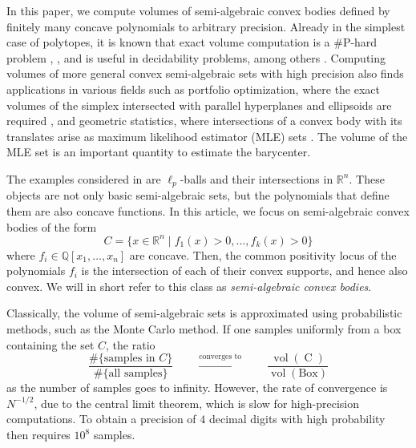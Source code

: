 \documentclass[sigconf, nonacm]{acmart} %
\DeclareMathOperator{\vol}{vol}
\begin{document}
In this paper, we compute volumes of semi-algebraic convex bodies defined by finitely many concave polynomials to arbitrary precision. 
Already in the simplest case of polytopes, it is known that exact volume computation is a \#P-hard problem \cite{volumes-is-difficult}, 
\cite{Khachiyan1993}, \cite{dyer-frieze} 
and is useful in decidability problems, among others \cite{GE2018110}. 
Computing volumes of more general convex semi-algebraic sets with high precision also finds applications in various fields such as portfolio optimization, where the exact volumes of the simplex intersected with parallel hyperplanes and ellipsoids are required \cite{portfolio}, and  geometric statistics, where intersections of a convex body with its translates arise as maximum likelihood estimator (MLE) sets \cite{rameshwahl}. The volume of the MLE set is an important quantity to estimate the barycenter. 

The examples considered in \cite{rameshwahl} are $\ell_p$-balls and their intersections in $\mathbb R^n$. These objects are not only basic semi-algebraic sets, but the polynomials that define them are also concave functions. In this article, we focus on semi-algebraic convex bodies of the form
\begin{equation}\label{eq:class}
    C = \{ x \in \mathbb R^n \mid f_1(x) > 0 , \dots, f_k(x) > 0 \}
\end{equation}
where $f_i \in \mathbb Q[x_1, \dots, x_n]$ are concave. Then, the common positivity locus of the polynomials $f_i$ is the intersection of each of their convex supports, and hence also convex. We will in short refer to this class as \textit{semi-algebraic convex bodies}.


Classically, the volume of semi-algebraic sets is approximated using probabilistic methods, such as the Monte Carlo method. If one samples  uniformly from a box containing the set $C$, the ratio 
\begin{equation*}
    \frac{\# \{\text{samples in $C$}\}}{\# \{\text{all samples}\}} \qquad \xrightarrow{\text{converges to}} \qquad\frac{\vol(\operatorname{C}) }{ \vol(\text{Box})}
\end{equation*}
as the number of samples goes to infinity. However, the rate of convergence is $N^{-1/2}$, due to the central limit theorem, which is slow for high-precision computations. To obtain a precision of $4$ decimal digits with high probability then requires $10^{8}$ samples. 
\end{document}
